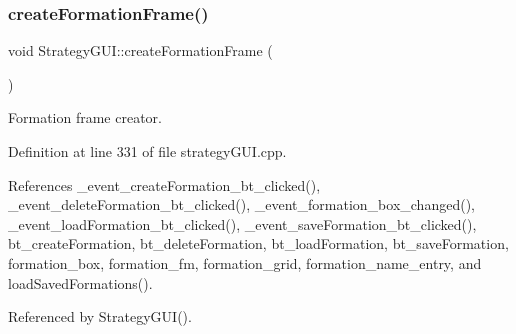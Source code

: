 \subsubsection{\texorpdfstring{create\+Formation\+Frame()}{createFormationFrame()}}
{\footnotesize\ttfamily void Strategy\+G\+U\+I\+::create\+Formation\+Frame (\begin{DoxyParamCaption}{ }\end{DoxyParamCaption})}



Formation frame creator. 



Definition at line 331 of file strategy\+G\+U\+I.\+cpp.



References \+\_\+event\+\_\+create\+Formation\+\_\+bt\+\_\+clicked(), \+\_\+event\+\_\+delete\+Formation\+\_\+bt\+\_\+clicked(), \+\_\+event\+\_\+formation\+\_\+box\+\_\+changed(), \+\_\+event\+\_\+load\+Formation\+\_\+bt\+\_\+clicked(), \+\_\+event\+\_\+save\+Formation\+\_\+bt\+\_\+clicked(), bt\+\_\+create\+Formation, bt\+\_\+delete\+Formation, bt\+\_\+load\+Formation, bt\+\_\+save\+Formation, formation\+\_\+box, formation\+\_\+fm, formation\+\_\+grid, formation\+\_\+name\+\_\+entry, and load\+Saved\+Formations().



Referenced by Strategy\+G\+U\+I().



